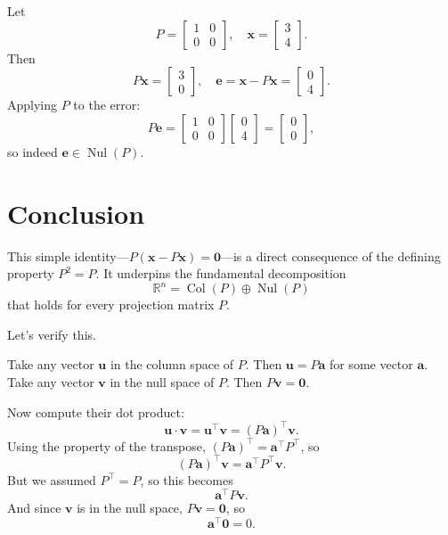 \documentclass{article}
\begin{document}
Let
\[
P = \begin{bmatrix} 1 & 0 \\ 0 & 0 \end{bmatrix}, \quad \mathbf{x} = \begin{bmatrix} 3 \\ 4 \end{bmatrix}.
\]
Then
\[
P\mathbf{x} = \begin{bmatrix} 3 \\ 0 \end{bmatrix}, \quad
\mathbf{e} = \mathbf{x} - P\mathbf{x} = \begin{bmatrix} 0 \\ 4 \end{bmatrix}.
\]
Applying \( P \) to the error:
\[
P\mathbf{e} = \begin{bmatrix} 1 & 0 \\ 0 & 0 \end{bmatrix} \begin{bmatrix} 0 \\ 4 \end{bmatrix} = \begin{bmatrix} 0 \\ 0 \end{bmatrix},
\]
so indeed \( \mathbf{e} \in \operatorname{Nul}(P) \).

\section*{Conclusion}

This simple identity—\( P(\mathbf{x} - P\mathbf{x}) = \mathbf{0} \)—is a direct consequence of the defining property \( P^2 = P \).  
It underpins the fundamental decomposition
\[
\mathbb{R}^n = \operatorname{Col}(P) \oplus \operatorname{Nul}(P)
\]
that holds for every projection matrix \( P \).


Let’s verify this.

Take any vector \( \mathbf{u} \) in the column space of \( P \). Then \( \mathbf{u} = P\mathbf{a} \) for some vector \( \mathbf{a} \).  
Take any vector \( \mathbf{v} \) in the null space of \( P \). Then \( P\mathbf{v} = \mathbf{0} \).

Now compute their dot product:
\[
\mathbf{u} \cdot \mathbf{v} = \mathbf{u}^\top \mathbf{v} = (P\mathbf{a})^\top \mathbf{v}.
\]
Using the property of the transpose, \( (P\mathbf{a})^\top = \mathbf{a}^\top P^\top \), so
\[
(P\mathbf{a})^\top \mathbf{v} = \mathbf{a}^\top P^\top \mathbf{v}.
\]
But we assumed \( P^\top = P \), so this becomes
\[
\mathbf{a}^\top P \mathbf{v}.
\]
And since \( \mathbf{v} \) is in the null space, \( P\mathbf{v} = \mathbf{0} \), so
\[
\mathbf{a}^\top \mathbf{0} = 0.
\]
\end{document}
